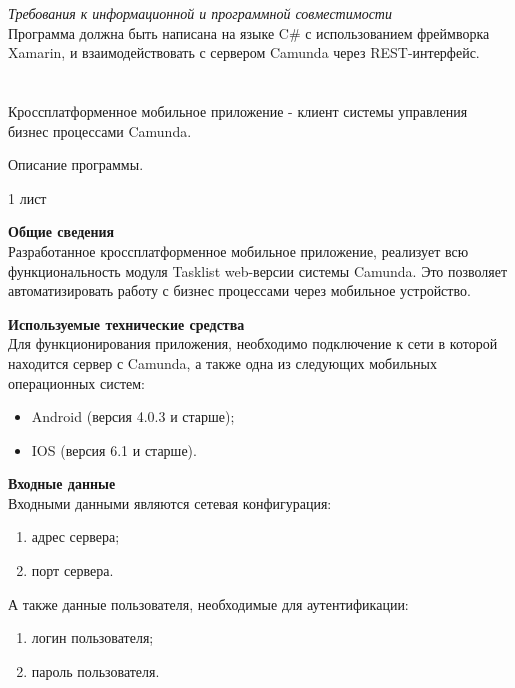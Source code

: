 \textit{Требования к информационной и программной совместимости}\\
Программа должна быть написана на языке C\# с использованием фреймворка Xamarin, и взаимодействовать с сервером Camunda через REST-интерфейс.


\chapter{}
\vspace{7em}

\begin{center}
	Кроссплатформенное мобильное приложение - клиент системы управления бизнес процессами Camunda.
\end{center}

\begin{center}
	Описание программы.
\end{center}
\begin{center}
	1 лист
\end{center}

\newpage
\textbf{Общие сведения}\\
Разработанное кроссплатформенное мобильное приложение, реализует всю функциональность модуля Tasklist web-версии системы Camunda. Это позволяет автоматизировать работу с бизнес процессами через мобильное устройство.

\textbf{Используемые технические средства}\\
Для функционирования приложения, необходимо подключение к сети в которой находится сервер с Camunda, а также одна из следующих мобильных операционных систем:
\begin{itemize}
	\item Android (версия 4.0.3 и старше);
	\item IOS (версия 6.1 и старше).
\end{itemize} 

\textbf{Входные данные}\\
Входными данными являются сетевая конфигурация:
\begin{enumerate}
	\item адрес сервера;
	\item порт сервера.
\end{enumerate}
А также данные пользователя, необходимые для аутентификации:
\begin{enumerate}
	\item логин пользователя;
	\item пароль пользователя.
\end{enumerate}

